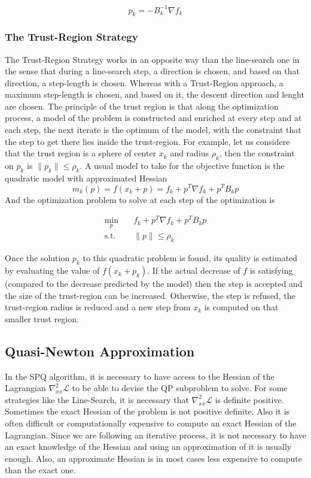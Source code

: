 \begin{equation}
  p_k = -B_k^{-1}\nabla f_k
\end{equation}

\subsubsection{The Trust-Region Strategy}
The Trust-Region Strategy works in an opposite way than the line-search one in
the sense that during a line-search step, a direction is chosen, and based on
that direction, a step-length is chosen. Whereas with a Trust-Region approach, a
maximum step-length is chosen, and based on it, the descent direction and lenght
are chosen.
The principle of the trust region is that along the optimization process, a
model of the problem is constructed and enriched at every step and at each step,
the next iterate is the optimum of the model, with the constraint that the step
to get there lies inside the trust-region. For example, let us considere that
the trust region is a sphere of center $x_k$ and radius $\rho_k$, then the
constraint on $p_k$ is $\|p_k\| \leq \rho_k$. A usual model to take for the
objective function is the quadratic model with approximated Hessian
\begin{equation}
  m_k(p) = f(x_k+p) = f_k + p^T\nabla f_k + p^TB_k p
\end{equation}
And the optimization problem to solve at each step of the optimization is

\begin{align}
  \min_{p} & \quad f_k + p^T\nabla f_k + p^TB_k p \nonumber\\
\text{s.t.}&
\quad \|p\| \leq \rho_k
\label{eq:trustRegion}
\end{align}

Once the solution $p_k$ to this quadratic problem is found, its quality is
estimated by evaluating the value of $f(x_k+p_k)$. If the actual decrease of $f$
is satisfying (compared to the decrease predicted by the model) then the step is
accepted and the size of the trust-region can be increased. Otherwise, the step
is refused, the trust-region radius is reduced and a new step from $x_k$ is
computed on that smaller trust region.

\subsection{Quasi-Newton Approximation}
\label{sub:quasi_newton_approximation}

In the SPQ algorithm, it is necessary to have access to the Hessian of the Lagrangian $\nabla_{xx}^2\mathcal{L}$ to be able to devise the QP subproblem to solve.
For some strategies like the Line-Search, it is necessary that $\nabla_{xx}^2\mathcal{L}$ is definite positive.
Sometimes the exact Hessian of the problem is not positive definite.
Also it is often difficult or computationally expensive to compute an exact Hessian of the Lagrangian.
Since we are following an iterative process, it is not necessary to have an exact knowledge of the Hessian and using an approximation of it is usually enough.
Also, an approximate Hessian is in most cases less expensive to compute than the exact one.


